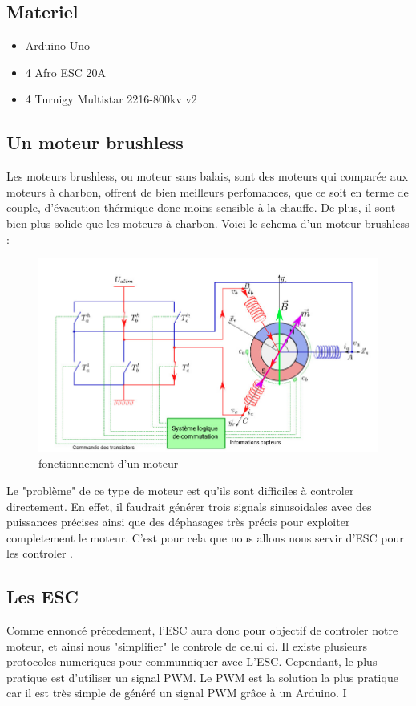 \documentclass[10pt,a4paper]{article}
\begin{document}
\subsection{ Materiel}
\begin{itemize}
 \item Arduino Uno
 \item 4 Afro ESC 20A
 \item 4 Turnigy Multistar 2216-800kv v2
 
\end{itemize}
\subsection{ Un moteur brushless}
Les moteurs brushless, ou moteur sans balais, sont des moteurs qui comparée aux moteurs à charbon, offrent de bien meilleurs perfomances, que ce soit en terme de couple, d'évacution thérmique donc moins sensible à la chauffe. De plus, il sont bien plus solide que les moteurs à charbon. Voici le schema d'un moteur brushless : 

\begin{figure}[h!]
\centering
\includegraphics[scale=0.250]{image/1.jpg}
\caption{fonctionnement d'un moteur}
\label{fig:net }
\end{figure}
Le "problème" de ce type de moteur est qu'ils sont difficiles à controler directement. En effet, il faudrait générer trois signals sinusoidales avec des puissances précises ainsi que des déphasages très précis pour exploiter completement le moteur. C'est pour cela que nous allons nous servir d'ESC pour les controler .

\subsection{Les ESC}
 Comme ennoncé précedement, l'ESC aura donc pour objectif de controler notre moteur, et ainsi nous "simplifier" le controle de celui ci. Il existe plusieurs protocoles numeriques pour communniquer avec L'ESC. Cependant, le plus pratique est d'utiliser un signal PWM. Le PWM est la solution la plus pratique car il est très simple de généré un signal PWM grâce à un Arduino. I
\end{document}
